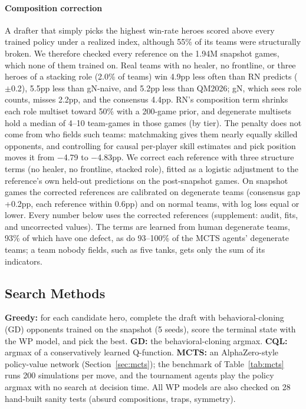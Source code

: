 \documentclass[journal]{IEEEtran}
\begin{document}
\paragraph{Composition correction} A drafter that simply picks the highest win-rate heroes scored above every trained policy under a realized index, although 55\% of its teams were structurally broken. We therefore checked every reference on the 1.94M snapshot games, which none of them trained on. Real teams with no healer, no frontline, or three heroes of a stacking role (2.0\% of teams) win 4.9pp less often than RN predicts ($\pm$0.2), 5.5pp less than gN-naive, and 5.2pp less than QM2026; gN, which sees role counts, misses 2.2pp, and the consensus 4.4pp. RN's composition term shrinks each role multiset toward 50\% with a 200-game prior, and degenerate multisets hold a median of 4--10 team-games in those games (by tier). The penalty does not come from who fields such teams: matchmaking gives them nearly equally skilled opponents, and controlling for causal per-player skill estimates and pick position moves it from $-$4.79 to $-$4.83pp. We correct each reference with three structure terms (no healer, no frontline, stacked role), fitted as a logistic adjustment to the reference's own held-out predictions on the post-snapshot games. On snapshot games the corrected references are calibrated on degenerate teams (consensus gap +0.2pp, each reference within 0.6pp) and on normal teams, with log loss equal or lower. Every number below uses the corrected references (supplement: audit, fits, and uncorrected values). The terms are learned from human degenerate teams, 93\% of which have one defect, as do 93--100\% of the MCTS agents' degenerate teams; a team nobody fields, such as five tanks, gets only the sum of its indicators.

\subsection{Search Methods}

\textbf{Greedy:} for each candidate hero, complete the draft with behavioral-cloning (GD) opponents trained on the snapshot (5 seeds), score the terminal state with the WP model, and pick the best. \textbf{GD:} the behavioral-cloning argmax. \textbf{CQL:} argmax of a conservatively learned Q-function. \textbf{MCTS:} an AlphaZero-style~\cite{silver2018general} policy-value network (Section~\ref{sec:mcts}); the benchmark of Table~\ref{tab:mcts} runs 200 simulations per move, and the tournament agents play the policy argmax with no search at decision time. All WP models are also checked on 28 hand-built sanity tests (absurd compositions, traps, symmetry).
\end{document}
